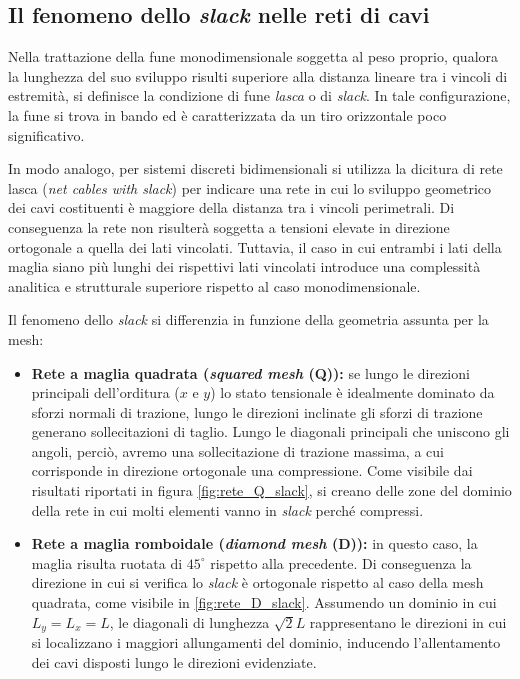 \subsection{Il fenomeno dello \textit{slack} nelle reti di cavi}
\label{sec:slack}
Nella trattazione della fune monodimensionale soggetta al peso proprio, qualora la lunghezza del suo sviluppo risulti superiore alla distanza lineare tra i vincoli di estremità, si definisce la condizione di fune \textit{lasca} o di \textit{slack}. In tale configurazione, la fune si trova in bando ed è caratterizzata da un tiro orizzontale poco significativo. 

In modo analogo, per sistemi discreti bidimensionali si utilizza la dicitura di rete lasca (\textit{net cables with slack}) per indicare una rete in cui lo sviluppo geometrico dei cavi costituenti è maggiore della distanza tra i vincoli perimetrali. Di conseguenza la rete non risulterà soggetta a tensioni elevate in direzione ortogonale a quella dei lati vincolati. Tuttavia, il caso in cui entrambi i lati della maglia siano più lunghi dei rispettivi lati vincolati introduce una complessità analitica e strutturale superiore rispetto al caso monodimensionale. 

Il fenomeno dello \textit{slack} si differenzia in funzione della geometria assunta per la mesh: 
\begin{itemize}
    \item \textbf{Rete a maglia quadrata (\textit{squared mesh} (Q)):} se lungo le direzioni principali dell'orditura ($x$ e $y$) lo stato tensionale è idealmente dominato da sforzi normali di trazione, lungo le direzioni inclinate gli sforzi di trazione generano sollecitazioni di taglio. Lungo le diagonali principali che uniscono gli angoli, perciò, avremo una sollecitazione di trazione massima, a cui corrisponde in direzione ortogonale una compressione. Come visibile dai risultati riportati in figura \cref{fig:rete_Q_slack}, si creano delle zone del dominio della rete in cui molti elementi vanno in \textit{slack} perché compressi.
    \item \textbf{Rete a maglia romboidale (\textit{diamond mesh} (D)):} in questo caso, la maglia risulta ruotata di $45^\circ$ rispetto alla precedente. Di conseguenza la direzione in cui si verifica lo \textit{slack} è ortogonale rispetto al caso della mesh quadrata, come visibile in \cref{fig:rete_D_slack}. Assumendo un dominio in cui  $L_y = L_x = L$, le diagonali di lunghezza $\sqrt{2} L$ rappresentano le direzioni in cui si localizzano i maggiori allungamenti del dominio, inducendo l'allentamento dei cavi disposti lungo le direzioni evidenziate.
\end{itemize}

